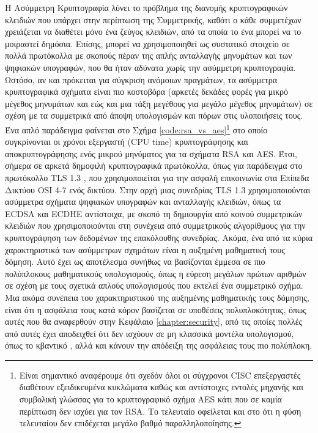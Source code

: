 Η Ασύμμετρη Κρυπτογραφία λύνει το πρόβλημα της διανομής κρυπτογραφικών κλειδιών που υπάρχει στην περίπτωση της Συμμετρικής, καθότι ο κάθε συμμετέχων χρειάζεται να διαθέτει μόνο ένα ζεύγος κλειδιών, από τα οποία το ένα μπορεί να το μοιραστεί δημόσια. Επίσης, μπορεί να χρησιμοποιηθεί ως συστατικό στοιχείο σε πολλά πρωτόκολλα με σκοπούς πέραν της απλής ανταλλαγής μηνυμάτων και των ψηφιακών υπογραφών, που θα ήταν αδύνατα χωρίς την ασύμμετρη κρυπτογραφία. Ωστόσο, αν και πρόκειται για σύγκριση ανόμοιων πραγμάτων, τα ασύμμετρα κρυπτογραφικά σχήματα είναι πιο κοστοβόρα (αρκετές δεκάδες φορές για μικρό μέγεθος μηνυμάτων και εώς και μια τάξη μεγέθους για μεγάλο μέγεθος μηνυμάτων) σε σχέση με τα συμμετρικά από άποψη υπολογισμών και πόρων στις υλοποιήσεις τους. Ένα απλό παράδειγμα φαίνεται στο Σχήμα \ref{code:rsa_vs_aes}\footnote{Είναι σημαντικό αναφέρουμε ότι σχεδόν όλοι οι σύγχρονοι CISC επεξεργαστές διαθέτουν εξειδικευμένα κυκλώματα καθώς και αντίστοιχες εντολές μηχανής και συμβολική γλώσσας για το κρυπτογραφικό σχήμα AES κάτι που σε καμία περίπτωση δεν ισχύει για τον RSA. Το τελευταίο οφείλεται και στο ότι η φύση τελευταίου δεν επιδέχεται μεγάλο βαθμό παραλληλοποίησης.} στο οποίο συγκρίνονται οι χρόνοι εξεργαστή (CPU time) κρυπτογράφησης και αποκρυπτογράφησης ενός μικρού μηνύματος για τα σχήματα RSA και AES. Έτσι, σήμερα σε αρκετά δημοφιλή κρυπτογραφικά πρωτόκολλα, όπως για παράδειγμα στο πρωτόκολλο TLS 1.3 \cite{RFC8446}, που χρησιμοποιείται για την ασφαλή επικοινωνία στα Επίπεδα Δικτύου OSI 4-7 ενός δικτύου. Στην αρχή μιας συνεδρίας TLS 1.3 χρησιμοποιούνται ασύμμετρα σχήματα ψηφιακών υπογραφών και ανταλλαγής κλειδιών, όπως τα ECDSA και ECDHE αντίστοιχα, με σκοπό τη δημιουργία από κοινού συμμετρικών κλειδιών που χρησιμοποιούνται στη συνέχεια από συμμετρικούς αλγορίθμους για την κρυπτογράφηση των δεδομένων της επακόλουθης συνεδρίας. Ακόμα, ένα από τα κύρια χαρακτηριστικά των ασύμμετρων σχημάτων είναι η αυξημένη μαθηματική τους δόμηση. Αυτό έχει ως αποτέλεσμα συνήθως να βασίζονται έμμεσα σε πιο πολύπλοκους μαθηματικούς υπολογισμούς, όπως η εύρεση μεγάλων πρώτων αριθμών σε σχέση με τους σχετικά απλούς υπολογισμούς που εκτελεί ένα συμμετρικό σχήμα. Μια ακόμα συνέπεια του χαρακτηριστικού της αυξημένης μαθηματικής τους δόμησης, είναι ότι η ασφάλεια τους κατά κόρον βασίζεται σε υποθέσεις πολυπλοκότητας, όπως αυτές που θα αναφερθούν στην Κεφάλαιο \ref{chapter:security}, από τις οποίες πολλές από αυτές έχει αποδειχθεί ότι δεν ισχύουν σε μη κλασσικά μοντέλα υπολογισμού, όπως το κβαντικό \cite{shor1994algorithms}, αλλά και κάνουν την απόδειξη της ασφάλειας τους πιο πολύπλοκη.

